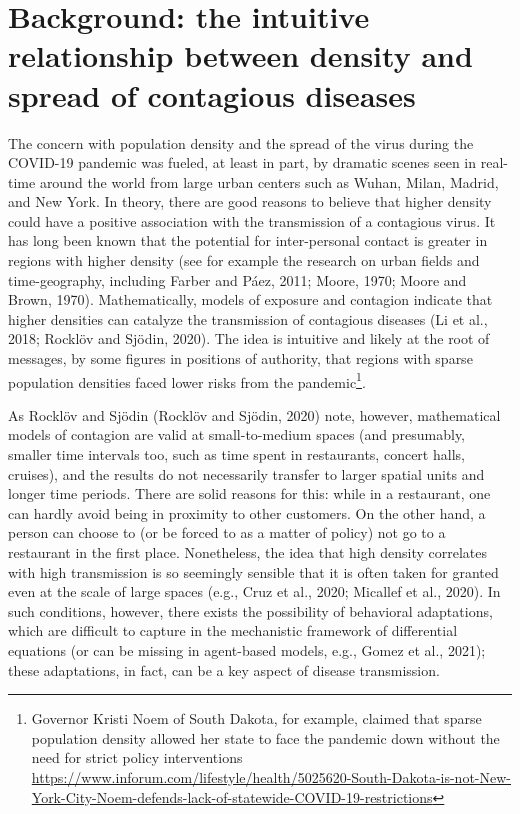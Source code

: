 \documentclass[]{elsarticle} %
\begin{document}
\hypertarget{background-the-intuitive-relationship-between-density-and-spread-of-contagious-diseases}{%
\section{Background: the intuitive relationship between density and
spread of contagious
diseases}\label{background-the-intuitive-relationship-between-density-and-spread-of-contagious-diseases}}

The concern with population density and the spread of the virus during
the COVID-19 pandemic was fueled, at least in part, by dramatic scenes
seen in real-time around the world from large urban centers such as
Wuhan, Milan, Madrid, and New York. In theory, there are good reasons to
believe that higher density could have a positive association with the
transmission of a contagious virus. It has long been known that the
potential for inter-personal contact is greater in regions with higher
density (see for example the research on urban fields and
time-geography, including Farber and Páez, 2011; Moore, 1970; Moore and
Brown, 1970). Mathematically, models of exposure and contagion indicate
that higher densities can catalyze the transmission of contagious
diseases (Li et al., 2018; Rocklöv and Sjödin, 2020). The idea is
intuitive and likely at the root of messages, by some figures in
positions of authority, that regions with sparse population densities
faced lower risks from the pandemic\footnote{Governor Kristi Noem of
  South Dakota, for example, claimed that sparse population density
  allowed her state to face the pandemic down without the need for
  strict policy interventions
  \url{https://www.inforum.com/lifestyle/health/5025620-South-Dakota-is-not-New-York-City-Noem-defends-lack-of-statewide-COVID-19-restrictions}}.

As Rocklöv and Sjödin (Rocklöv and Sjödin, 2020) note, however,
mathematical models of contagion are valid at small-to-medium spaces
(and presumably, smaller time intervals too, such as time spent in
restaurants, concert halls, cruises), and the results do not necessarily
transfer to larger spatial units and longer time periods. There are
solid reasons for this: while in a restaurant, one can hardly avoid
being in proximity to other customers. On the other hand, a person can
choose to (or be forced to as a matter of policy) not go to a restaurant
in the first place. Nonetheless, the idea that high density correlates
with high transmission is so seemingly sensible that it is often taken
for granted even at the scale of large spaces (e.g., Cruz et al., 2020;
Micallef et al., 2020). In such conditions, however, there exists the
possibility of behavioral adaptations, which are difficult to capture in
the mechanistic framework of differential equations (or can be missing
in agent-based models, e.g., Gomez et al., 2021); these adaptations, in
fact, can be a key aspect of disease transmission.
\end{document}
